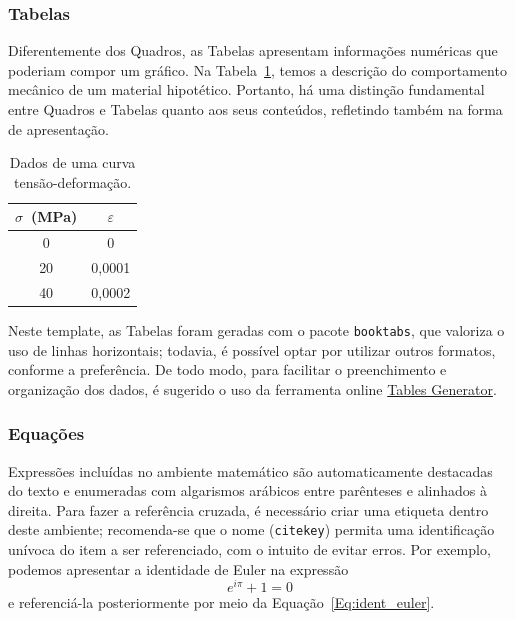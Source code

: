 \documentclass[
	12pt,				%
	oneside,			%
	a4paper,			%
	chapter=TITLE,		%
	section=TITLE,		%
	english,			%
	brazil,				%
	]{abntex2}
\begin{document}
\begin{apendicesenv}
    \subsubsection{Tabelas}
    \label{Sec:ref_tabelas}

    Diferentemente dos Quadros, as Tabelas apresentam informações numéricas que poderiam compor um gráfico.
    Na Tabela~\ref{Tab:tensao_deformacao}, temos a descrição do comportamento mecânico de um material hipotético.
    Portanto, há uma distinção fundamental entre Quadros e Tabelas quanto aos seus conteúdos, refletindo também na forma de apresentação.

    \begin{table}[htb]
        \centering
        \caption{Dados de uma curva tensão-deformação.}
        \begin{tabular}{cc}
            \toprule
            $\sigma$~(MPa) & $\varepsilon$ \\
            \midrule
            0              & 0             \\
            20             & 0,0001        \\
            40             & 0,0002        \\
            \bottomrule
        \end{tabular}
        \label{Tab:tensao_deformacao}
    \end{table}

    Neste template, as Tabelas foram geradas com o pacote \verb|booktabs|, que valoriza o uso de linhas horizontais; todavia, é possível optar por utilizar outros formatos, conforme a preferência.
    De todo modo, para facilitar o preenchimento e organização dos dados, é sugerido o uso da ferramenta online \href{https://www.tablesgenerator.com/}{Tables Generator}.

    \subsubsection{Equações}
    \label{Sec:ref_equacoes}

    Expressões incluídas no ambiente matemático são automaticamente destacadas do texto e enumeradas com algarismos arábicos entre parênteses e alinhados à direita.
    Para fazer a referência cruzada, é necessário criar uma etiqueta dentro deste ambiente; recomenda-se que o nome (\verb|citekey|) permita uma identificação unívoca do item a ser referenciado, com o intuito de evitar erros.
    Por exemplo, podemos apresentar a identidade de Euler na expressão
    \begin{equation}
        e^{i \pi} + 1 = 0
        \label{Eq:ident_euler}
    \end{equation}
    e referenciá-la posteriormente por meio da Equação~\ref{Eq:ident_euler}.


\end{apendicesenv}
\end{document}
